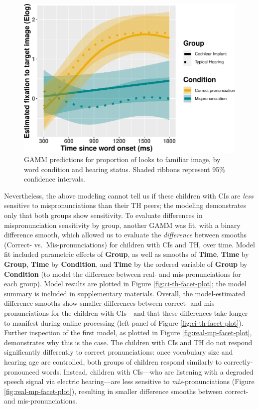 \documentclass[
]{article}
\begin{document}
\begin{figure}
\centering
\includegraphics{2_modeling_files/figure-latex/2x2-plot-1.pdf}
\caption{\label{fig:2x2-plot}GAMM predictions for proportion of looks to familiar image, by word condition and hearing status. Shaded ribbons represent 95\% confidence intervals.}
\end{figure}

Nevertheless, the above modeling cannot tell us if these children with CIs are \emph{less} sensitive to mispronunciations than their TH peers; the modeling demonstrates only that both groups show sensitivity. To evaluate differences in mispronunciation sensitivity by group, another GAMM was fit, with a binary difference smooth, which allowed us to evaluate the \emph{difference} between smooths (Correct- vs.~Mis-pronunciations) for children with CIs and TH, over time. Model fit included parametric effects of \textbf{Group}, as well as smooths of \textbf{Time}, \textbf{Time} by \textbf{Group}, \textbf{Time} by \textbf{Condition}, and \textbf{Time} by the ordered variable of \textbf{Group} by \textbf{Condition} (to model the difference between real- and mis-pronunciations for each group). Model results are plotted in Figure \ref{fig:ci-th-facet-plot}; the model summary is included in supplementary materials. Overall, the model-estimated difference smooths show smaller differences between correct- and mis-pronunciations for the children with CIs---and that these differences take longer to manifest during online processing (left panel of Figure \ref{fig:ci-th-facet-plot}). Further inspection of the first model, as plotted in Figure \ref{fig:real-mp-facet-plot}, demonstrates why this is the case. The children with CIs and TH do not respond significantly differently to correct pronunciations: once vocabulary size and hearing age are controlled, both groups of children respond similarly to correctly-pronounced words. Instead, children with CIs---who are listening with a degraded speech signal via electric hearing---are less sensitive to \emph{mis}-pronunciations (Figure \ref{fig:real-mp-facet-plot}), resulting in smaller difference smooths between correct- and mis-pronunciations.
\end{document}
